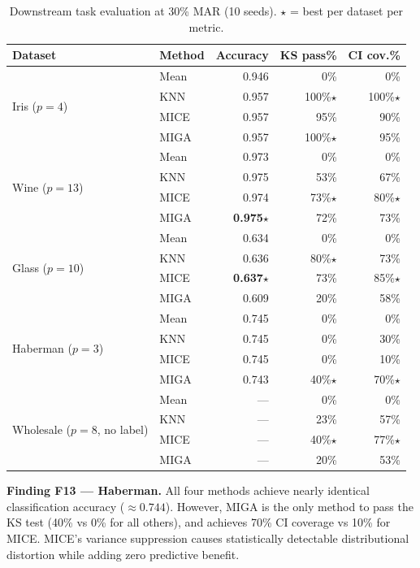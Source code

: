 \begin{table}[h]
\caption{Downstream task evaluation at 30\% MAR (10 seeds). $\star$ = best per dataset per metric.}
\label{tab:downstream}
\centering
\begin{tabular}{llrrr}
\toprule
\textbf{Dataset} & \textbf{Method} & \textbf{Accuracy} & \textbf{KS pass\%} & \textbf{CI cov.\%} \\
\midrule
\multirow{4}{*}{Iris ($p=4$)}
 & Mean & 0.946 &   0\% &   0\% \\
 & KNN  & 0.957 & 100\%$\star$ & 100\%$\star$ \\
 & MICE & 0.957 &  95\% &  90\% \\
 & MIGA & 0.957 & 100\%$\star$ &  95\% \\
\midrule
\multirow{4}{*}{Wine ($p=13$)}
 & Mean & 0.973 &   0\% &   0\% \\
 & KNN  & 0.975 &  53\% &  67\% \\
 & MICE & 0.974 &  73\%$\star$ &  80\%$\star$ \\
 & MIGA & \textbf{0.975}$\star$ &  72\% &  73\% \\
\midrule
\multirow{4}{*}{Glass ($p=10$)}
 & Mean & 0.634 &   0\% &   0\% \\
 & KNN  & 0.636 &  80\%$\star$ &  73\% \\
 & MICE & \textbf{0.637}$\star$ &  73\% &  85\%$\star$ \\
 & MIGA & 0.609 &  20\% &  58\% \\
\midrule
\multirow{4}{*}{Haberman ($p=3$)}
 & Mean & 0.745 &   0\% &   0\% \\
 & KNN  & 0.745 &   0\% &  30\% \\
 & MICE & 0.745 &   0\% &  10\% \\
 & MIGA & 0.743 &  40\%$\star$ &  70\%$\star$ \\
\midrule
\multirow{4}{*}{Wholesale ($p=8$, no label)}
 & Mean &  ---  &   0\% &   0\% \\
 & KNN  &  ---  &  23\% &  57\% \\
 & MICE &  ---  &  40\%$\star$ &  77\%$\star$ \\
 & MIGA &  ---  &  20\% &  53\% \\
\bottomrule
\end{tabular}
\end{table}

\textbf{Finding F13 --- Haberman.} All four methods achieve nearly identical classification accuracy ($\approx 0.744$). However, MIGA is the only method to pass the KS test (40\% vs 0\% for all others), and achieves 70\% CI coverage vs 10\% for MICE. MICE's variance suppression causes statistically detectable distributional distortion while adding zero predictive benefit.

